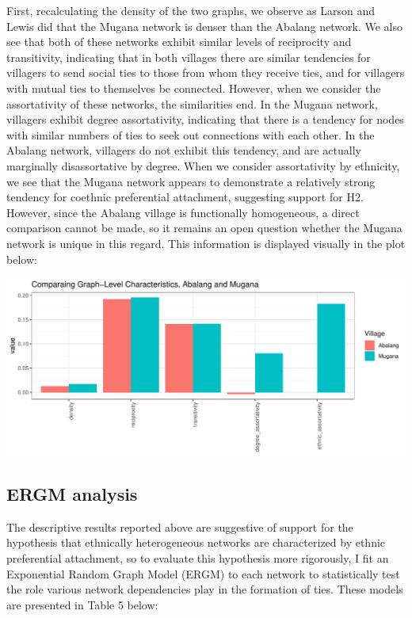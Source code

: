 \documentclass[]{article}
\begin{document}


First, recalculating the density of the two graphs, we observe as Larson and Lewis did that the Mugana network is denser than the Abalang network. We also see that both of these networks exhibit similar levels of reciprocity and transitivity, indicating that in both villages there are similar tendencies for villagers to send social ties to those from whom they receive ties, and for villagers with mutual ties to themselves be connected. However, when we consider the assortativity of these networks, the similarities end. In the Mugana network, villagers exhibit degree assortativity, indicating that there is a tendency for nodes with similar numbers of ties to seek out connections with each other. In the Abalang network, villagers do not exhibit this tendency, and are actually marginally disassortative by degree. When we consider assortativity by ethnicity, we see that the Mugana network appears to demonstrate a relatively strong tendency for coethnic preferential attachment, suggesting support for H2. However, since the Abalang village is functionally homogeneous, a direct comparison cannot be made, so it remains an open question whether the Mugana network is unique in this regard. This information is displayed visually in the plot below:

\includegraphics{./figures/graph_characteristics.pdf}

\subsection{ERGM analysis}

The descriptive results reported above are suggestive of support for the hypothesis that ethnically heterogeneous networks are characterized by ethnic preferential attachment, so to evaluate this hypothesis more rigorously, I fit an Exponential Random Graph Model (ERGM) to each network to statistically test the role various network dependencies play in the formation of ties. These models are presented in Table 5 below:
\end{document}
